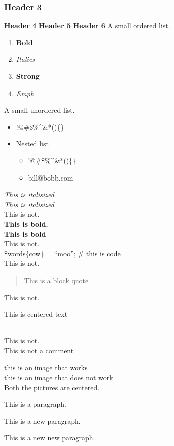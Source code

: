 \documentclass[10pt]{article}
\begin{document}
\subsubsection*{Header 3}
\textbf{Header 4}
\textbf{Header 5}
\textbf{Header 6}
 A small ordered list. \begin{enumerate}
\item \textbf{Bold}

\item \emph{Italics}

\item \textbf{Strong}

\item \emph{Emph}


\end{enumerate}
 A small unordered list. \begin{itemize}
\item  !@\#\$\%\^{}\&*()\{\} 
\item  Nested list \begin{itemize}
\item  !@\#\$\%\^{}\&*()\{\} 
\item  bill@bobb.com 

\end{itemize}


\end{itemize}
\emph{This is italisized}
\\ 
\emph{This is italisized}
\\ 
 This is not.\\ 
\textbf{This is bold.}
\\ 
\textbf{This is bold}
\\ 
 This is not.\\ 
 \$words\{cow\} = ``moo''; \# this is code\\ 
 This is not.\\ 
\begin{quote}
This is a block quote
\end{quote}
 This is not.\\ 
\begin{center}
This is centered text
\end{center}
\\ 
 This is not.\\ 
 This is not a comment\\ 
\begin{center}
this is an image that works\\ 
this is an image that does not work\\ 
 Both the pictures are centered. 
\end{center}


 This is a paragraph.


 This is a new paragraph.


 This is a new new paragraph. 
\end{document}
